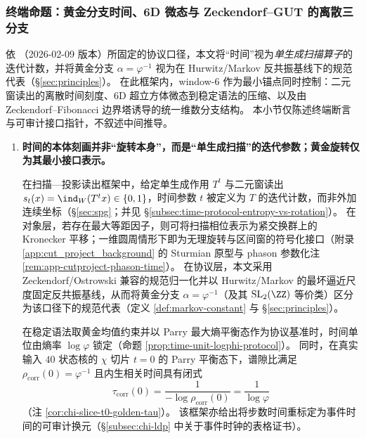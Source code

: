 \subsubsection{终端命题：黄金分支时间、6D 微态与 Zeckendorf--GUT 的离散三分支}
\label{subsubsec:window6-terminal-propositions}

依 \cite{Internal2026POMGenerativeAddressThreeRegisterBridgeRH}（2026-02-09 版本）所固定的协议口径，本文将“时间”视为\emph{单生成扫描算子}的迭代计数，并将黄金分支 \(\alpha=\varphi^{-1}\) 视为在 Hurwitz/Markov 反共振基线下的规范代表（\S\ref{sec:principles}）。
在此框架内，window-\(6\) 作为最小锚点同时控制：二元窗读出的离散时间刻度、6D 超立方体微态到稳定语法的压缩、以及由 Zeckendorf--Fibonacci 边界塔诱导的统一维数分支结构。
本小节仅陈述终端断言与可审计接口指针，不叙述中间推导。

\begin{enumerate}
  \item \textbf{时间的本体刻画并非“旋转本身”，而是“单生成扫描”的迭代参数；黄金旋转仅为其最小接口表示。}

  \begin{theorem}[扫描迭代时间与黄金分支的规范性]
  \label{thm:terminal-time-protocol-golden-branch}
  在扫描—投影读出框架中，给定单生成作用 \(T^t\) 与二元窗读出
  \(s_t(x)=\ind_W(T^t x)\in\{0,1\}\)，时间参数 \(t\) 被定义为 \(T\) 的迭代计数，而非外加连续坐标（\S\ref{sec:spg}；并见 \S\ref{subsec:time-protocol-entropy-vs-rotation}）。
  在对象层，若存在最大等距因子，则可将扫描相位表示为紧交换群上的 Kronecker 平移；一维圆周情形下即为无理旋转与区间窗的符号化接口（附录 \ref{app:cut_project_background} 的 Sturmian 原型与 phason 参数化注 \ref{rem:app-cutproject-phason-time}）。
  在协议层，本文采用 Zeckendorf/Ostrowski 兼容的规范归一化并以 Hurwitz/Markov 的最坏逼近尺度固定反共振基线，从而将黄金分支 \(\alpha=\varphi^{-1}\)（及其 \(\mathrm{SL}_2(\ZZ)\) 等价类）区分为该口径下的规范代表（定义 \ref{def:markov-constant} 与 \S\ref{sec:principles}）。
  \end{theorem}

  \begin{corollary}
  \label{cor:terminal-tau-corr-logphi}
  在稳定语法取黄金均值约束并以 Parry 最大熵平衡态作为协议基准时，时间单位由熵率 \(\log\varphi\) 锁定（命题 \ref{prop:time-unit-logphi-protocol}）。
  同时，在真实输入 \(40\) 状态核的 \(\chi\) 切片 \(t=0\) 的 Parry 平衡态下，谱隙比满足
  \(
  \rho_{\mathrm{corr}}(0)=\varphi^{-1}
  \)
  且内生相关时间具有闭式
  \[
  \tau_{\mathrm{corr}}(0)=\frac{1}{-\log\rho_{\mathrm{corr}}(0)}=\frac{1}{\log\varphi}
  \]
  （注 \ref{cor:chi-slice-t0-golden-tau}）。
  该框架亦给出将步数时间重标定为事件时间的可审计换元（\S\ref{subsec:chi-ldp} 中关于事件时钟的表格证书）。
  \end{corollary}


\end{enumerate}
